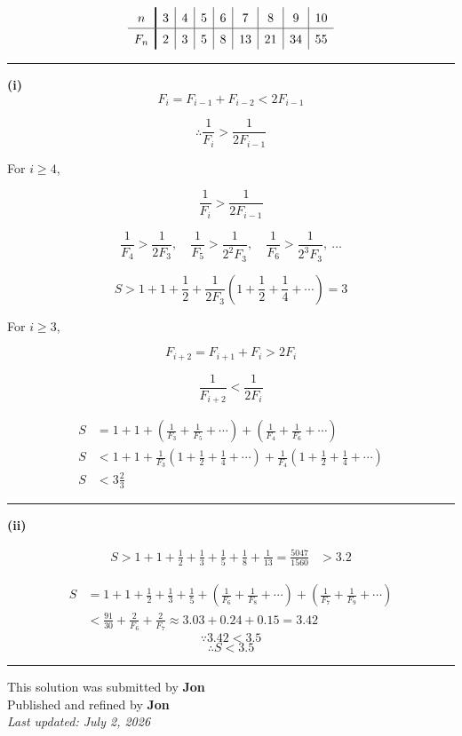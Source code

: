 \documentclass[12pt]{article}
\begin{document}
\newcommand{\ds}{\displaystyle}

$$
\renewcommand{\arraystretch}{1.4}
\begin{array}{c!{\vrule width 1.2pt}c|c|c|c|c|c|c|c}
n & 3 & 4 & 5 & 6 & 7 & 8 & 9 & 10\\
\hline
\rule[-4pt]{0pt}{14pt}
F_n & 2 & 3 & 5 & 8 & 13 & 21 & 34 & 55
\end{array}
$$

\bigskip\hrule\bigskip

\textbf{(i)}
$$F_i=F_{i-1}+F_{i-2}<2F_{i-1}$$

$$\therefore \frac1{F_i}>\frac1{2F_{i-1}}$$

For $\ds i\geq 4$,

$$\frac1{F_i}>\frac1{2F_{i-1}}$$

$$\frac1{F_4}>\frac1{2F_3},\quad\frac1{F_5}>\frac1{2^2F_3},\quad\frac1{F_6}>\frac1{2^3F_3},\ \ldots$$

$$S>1+1+\frac12+\frac1{2F_3}\left(1+\frac12+\frac14+\cdots\right)=3$$


For $\ds i\geq 3$,

$$F_{i+2}=F_{i+1}+F_i>2F_i$$

$$\frac1{F_{i+2}}<\frac1{2F_i}$$

\begin{align*}
S
&=1+1+\left(\frac1{F_3}+\frac1{F_5}+\cdots\right)
+\left(\frac1{F_4}+\frac1{F_6}+\cdots\right)\\
S&<1+1+\frac1{F_3}\left(1+\frac12+\frac14+\cdots\right)
+\frac1{F_4}\left(1+\frac12+\frac14+\cdots\right)\\
S&<3\frac23
\end{align*}


\bigskip\hrule\bigskip

\textbf{(ii)}

\begin{align*}
S>1+1+\frac12+\frac13+\frac15+\frac18+\frac1{13}=\frac{5047}{1560}
&>3.2
\end{align*}

\begin{align*}
S
&=1+1+\frac12+\frac13+\frac15
+\left(\frac1{F_6}+\frac1{F_8}+\cdots\right)
+\left(\frac1{F_7}+\frac1{F_9}+\cdots\right)\\
&<\frac{91}{30}+\frac2{F_6}+\frac2{F_7}\approx3.03+0.24+0.15=3.42
\end{align*}
$$\because 3.42<3.5$$
$$\therefore S<3.5$$

\bigskip
\hrule
\begin{center}
    This solution was submitted by \textbf{Jon}\\[4pt]
    Published and refined by \textbf{Jon}\\[8pt]
    \textit{Last updated: July 2, 2026}
\end{center}
\end{document}
